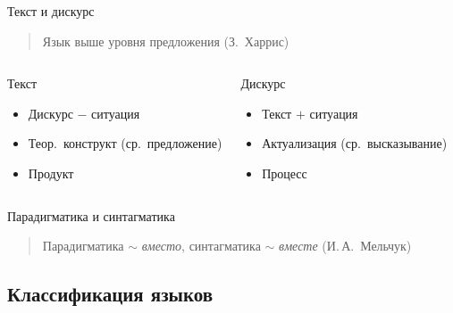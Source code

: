 
\begin{frame}{Текст и дискурс}
    \begin{quote}
        Язык выше уровня предложения (З.~Харрис)
    \end{quote}

    \begin{columns}
        \begin{block}{Текст}
            \begin{itemize}
                \item Дискурс $-$ ситуация
                \item Теор.\ конструкт (ср.\ предложение)
                \item Продукт
            \end{itemize}
        \end{block}

        \begin{block}{Дискурс}
            \begin{itemize}
                \item Текст $+$ ситуация
                \item Актуализация (ср.\ высказывание)
                \item Процесс
            \end{itemize}
        \end{block}
    \end{columns}
\end{frame}

\begin{frame}{Парадигматика и синтагматика}
    \begin{quote}
        Парадигматика $\sim$ \textit{вместо}, синтагматика $\sim$ \textit{вместе} (И.\,А.~Мельчук)
    \end{quote}
\end{frame}


\subsection{Классификация языков}

